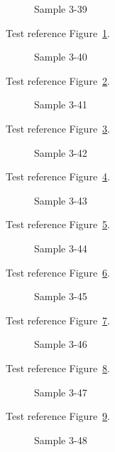 \begin{figure}[tbhp]
\caption{Sample 3-39}
\label{fig:sample-3-39}
\end{figure}

Test reference Figure~\ref{fig:sample-3-39}.

\begin{figure}[tbhp]
\caption{Sample 3-40}
\label{fig:sample-3-40}
\end{figure}

Test reference Figure~\ref{fig:sample-3-40}.

\begin{figure}[tbhp]
\caption{Sample 3-41}
\label{fig:sample-3-41}
\end{figure}

Test reference Figure~\ref{fig:sample-3-41}.

\begin{figure}[tbhp]
\caption{Sample 3-42}
\label{fig:sample-3-42}
\end{figure}

Test reference Figure~\ref{fig:sample-3-42}.

\begin{figure}[tbhp]
\caption{Sample 3-43}
\label{fig:sample-3-43}
\end{figure}

Test reference Figure~\ref{fig:sample-3-43}.

\begin{figure}[tbhp]
\caption{Sample 3-44}
\label{fig:sample-3-44}
\end{figure}

Test reference Figure~\ref{fig:sample-3-44}.

\begin{figure}[tbhp]
\caption{Sample 3-45}
\label{fig:sample-3-45}
\end{figure}

Test reference Figure~\ref{fig:sample-3-45}.

\begin{figure}[tbhp]
\caption{Sample 3-46}
\label{fig:sample-3-46}
\end{figure}

Test reference Figure~\ref{fig:sample-3-46}.

\begin{figure}[tbhp]
\caption{Sample 3-47}
\label{fig:sample-3-47}
\end{figure}

Test reference Figure~\ref{fig:sample-3-47}.

\begin{figure}[tbhp]
\caption{Sample 3-48}
\label{fig:sample-3-48}
\end{figure}

